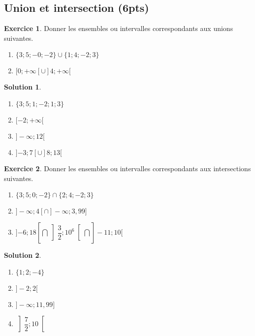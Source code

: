\documentclass[a4paper, 14pt]{extarticle}
\theoremstyle{plain}
\newtheorem*{sol}{Solution}
\theoremstyle{definition}
\newtheorem{ex}{Exercice}
\newcommand{\pinfty}{{+}\infty}
\newcommand{\minfty}{{-}\infty}
\newcommand{\exe}[2]{
		\begin{ex} #1  \end{ex}
		\begin{sol} #2 \end{sol}
	}
\newcommand{\exe}[2]{
		\begin{ex} #1  \end{ex}
	}
\begin{document}
\subsection*{Union et intersection (6pts)}

\exe{
	Donner les ensembles ou intervalles correspondants aux unions suivantes.
	\begin{multicols}{2}
	\begin{enumerate}
		\item $\{ 3 ; 5 ; -0 ; -2 \} \cup \{  1; 4 ; -2 ; 3\}$
		\item $[0 ; \pinfty[ \cup ]4 ; \pinfty[$
	\end{enumerate}
	\end{multicols}
}
{

	\begin{multicols}{2}
	\begin{enumerate}
		\item $\{3;5;1;-2;1;3\}$
		\item $[{-}2 ; \pinfty[$
		\item $ ]\minfty ; 12[$
		\item $]{-3};7[ \cup ]8; 13[$
	\end{enumerate}
	\end{multicols}

}


\exe{
	Donner les ensembles ou intervalles correspondants aux intersections suivantes.
	\begin{multicols}{2}
	\begin{enumerate}
		\item $\{ 3 ; 5 ; 0 ; -2 \} \cap \{  2; 4 ; -2 ; 3\}$
		\item $ ]\minfty ; 4[ \cap ]\minfty ; 3{,}99]$
		\item $]{-6};18[ \bigcap \left]\dfrac32; 10^6\right[ \bigcap ]{-}11; 10[$
	\end{enumerate}
	\end{multicols}
}
{

	\begin{multicols}{2}
	\begin{enumerate}
		\item $\{ 1 ; 2 ; -4\}$
		\item $]-2; 2[$
		\item $]\minfty ; 11{,}99]$
		\item $\left]\dfrac72 ; 10\right[$
	\end{enumerate}
	\end{multicols}

}
\end{document}
